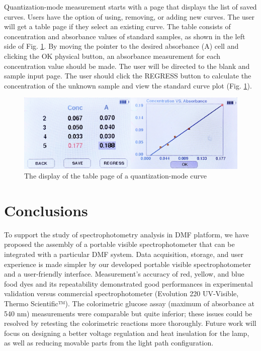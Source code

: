 \documentclass[conference]{IEEEtran}
\begin{document}
Quantization-mode measurement starts with a page that displays the list of saved curves.
Users have the option of using, removing, or adding new curves.
The user will get a table page if they select an existing curve.
The table consists of concentration and absorbance values of standard samples, as shown in the left side of Fig. \ref{lcd-conc}.
By moving the pointer to the desired absorbance (A) cell and clicking the OK physical button, an absorbance measurement for each concentration value should be made.
The user will be directed to the blank and sample input page.
The user should click the REGRESS button to calculate the concentration of the unknown sample and view the standard curve plot (Fig. \ref{lcd-conc}).

    \begin{figure}[htbp]
    \centerline{\includegraphics[scale=0.06]{lcd-conc.jpeg}}
    \caption{The display of the table page of a quantization-mode curve}
    \label{lcd-conc}
    \end{figure}

\section{Conclusions}
To support the study of spectrophotometry analysis in DMF platform, we have proposed the assembly of a portable visible spectrophotometer that can be integrated with a particular DMF system.
Data acquisition, storage, and user experience is made simpler by our developed portable visible spectrophotometer and a user-friendly interface.
Measurement's accuracy of red, yellow, and blue food dyes and its repeatability demonstrated good performances in experimental validation versus commercial spectrophotometer (Evolution 220 UV-Visible, Thermo Scientific™).
The colorimetric glucose assay (maximum of absorbance at 540 nm) measurements were comparable but quite inferior; these issues could be resolved by retesting the colorimetric reactions more thoroughly.
Future work will focus on designing a better voltage regulation and heat insulation for the lamp, as well as reducing movable parts from the light path configuration.
\end{document}
